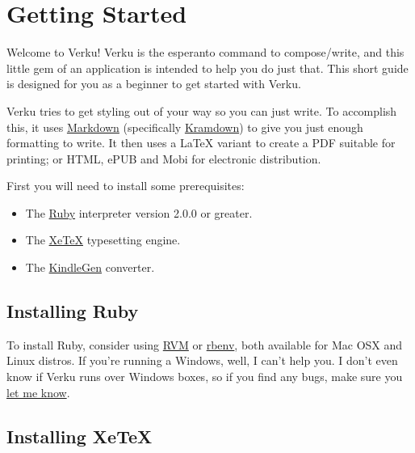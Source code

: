 \documentclass[11pt,twoside,makeidx,hidelinks,]{memoir}
\begin{document}
  
  


  \newpage
\mainmatter
  \pagestyle{ebook}
  \sloppy

\chapter{Getting Started}\hypertarget{getting-started}{}\label{getting-started}

Welcome to Verku! Verku is the esperanto command to compose/write, and this little gem of an application is intended to help you do just that. This short guide is designed for you as a beginner to get started with Verku.

Verku tries to get styling out of your way so you can just write. To accomplish this, it uses \href{https://daringfireball.net/projects/markdown/}{Markdown} (specifically \href{kramdown.gettalong.org/syntax.html}{Kramdown}) to give you just enough formatting to write. It then uses a LaTeX variant to create a PDF suitable for printing; or HTML, ePUB and Mobi for electronic distribution.

First you will need to install some prerequisites:

\begin{itemize}
\item{} The \href{http://ruby-lang.org}{Ruby} interpreter version 2.0.0 or greater.
\item{} The \href{hhttps://en.wikipedia.org/wiki/XeTeX}{XeTeX} typesetting engine.
\item{} The \href{http://www.amazon.com/gp/feature.html?docId=1000765211}{KindleGen} converter.
\end{itemize}

\section{Installing Ruby}\hypertarget{installing-ruby}{}\label{installing-ruby}

To install Ruby, consider using \href{http://rvm.io}{RVM} or \href{http://rbenv.org}{rbenv}, both available for Mac OSX and Linux distros. If you're running a Windows, well, I can't help you. I don't even know if Verku runs over Windows boxes, so if you find any bugs, make sure you \href{https://github.com/Merovex/verku/issues}{let me know}.

\section{Installing XeTeX}\hypertarget{installing-xetex}{}\label{installing-xetex}
\end{document}
